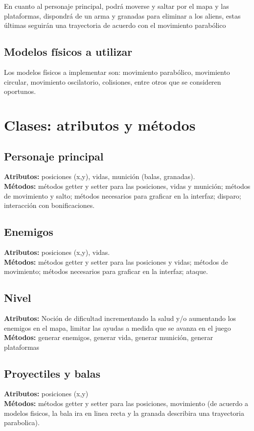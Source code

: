 \documentclass{article}
\begin{document}
En cuanto al personaje principal, podrá moverse y saltar por el mapa y las plataformas, dispondrá de un arma y granadas para eliminar a los aliens, estas últimas seguirán una trayectoria de acuerdo con el movimiento parabólico


\subsection{Modelos físicos a utilizar}
Los modelos físicos a implementar son: movimiento parabólico, movimiento circular, movimiento oscilatorio, colisiones, entre otros que se consideren oportunos.


\section{Clases: atributos y métodos}

\subsection{Personaje principal}
\noindent\textbf{Atributos:} posiciones (x,y), vidas, munición (balas, granadas).\\
\textbf{Métodos:} métodos getter y setter para las posiciones, vidas y munición; métodos de movimiento y salto; métodos necesarios para graficar en la interfaz; disparo; interacción con bonificaciones.

\subsection{Enemigos}
\noindent\textbf{Atributos:} posiciones (x,y), vidas.\\
\textbf{Métodos:} métodos getter y setter para las posiciones y vidas; métodos de movimiento; métodos necesarios para graficar en la interfaz; ataque.

\subsection{Nivel}
\noindent\textbf{Atributos:} Noción de dificultad incrementando la salud y/o aumentando los enemigos en el mapa, limitar las ayudas a medida que se avanza en el juego\\
\textbf{Métodos:} generar enemigos, generar vida, generar munición, generar plataformas

\subsection{Proyectiles y balas}
\noindent\textbf{Atributos:} posiciones (x,y)\\
\textbf{Métodos:} métodos getter y setter para las posiciones, movimiento (de acuerdo a modelos fisicos, la bala ira en linea recta y la granada describira una trayectoria parabolica).
\end{document}

